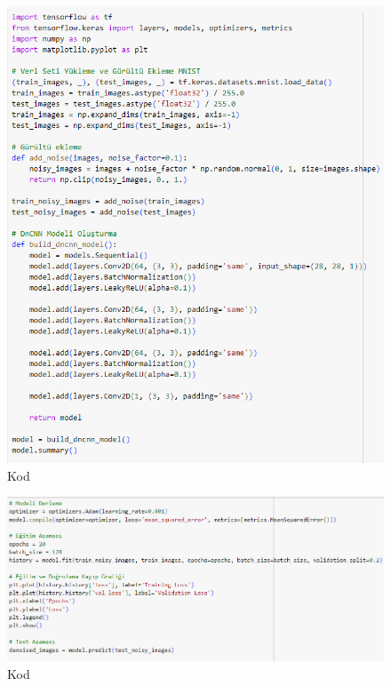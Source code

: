 \documentclass{article}
\begin{document}
\renewcommand{\figurename}{Şekil}

\begin{figure}[htbp]
     \centering
\includegraphics[angle=360,width=1.1\textwidth]{mnıst1.png}\centering 
  \caption{Kod}
  \label{fig:resim_etiketi}
\end{figure}

\renewcommand{\figurename}{Şekil}

\begin{figure}[htbp]
     \centering
\includegraphics[angle=360,width=1.1\textwidth]{mnıst2.png}\centering 
  \caption{Kod}
  \label{fig:resim_etiketi}
\end{figure}
\end{document}
